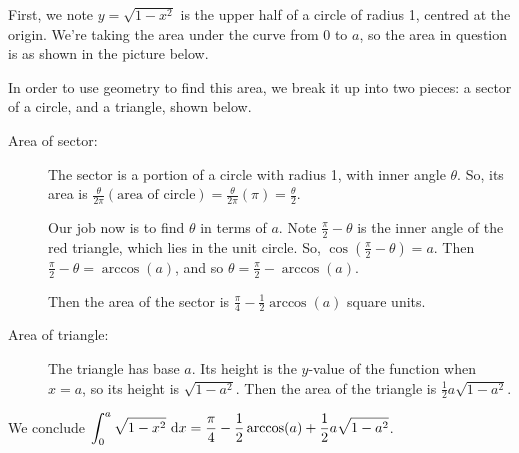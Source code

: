 \begin{solution}
First, we note $y=\sqrt{1-x^2}$ is the upper half of a circle of radius 1, centred at the origin. We're taking the area under the curve from 0 to $a$, so the area in question is as shown in the picture below.

\begin{center}
\end{center}

In order to use geometry to find this area, we break it up into two pieces: a sector of a circle, and a triangle, shown below.

\begin{center}
\end{center}
\begin{description}
\item[Area of sector:] The sector is a portion of a circle with radius 1, with inner angle $\theta$. So, its area is $\frac{\theta}{2\pi}\left(\mbox{area of circle}\right) = \frac{\theta}{2\pi}\left(\pi\right) = \frac{\theta}{2}$.

Our job now is to find $\theta$ in terms of $a$. Note $\frac{\pi}{2}-\theta$ is the inner angle of the red triangle, which lies in the unit circle. So, $\cos\left(\frac{\pi}{2}-\theta\right)=a$. Then $\frac{\pi}{2}-\theta= \arccos(a)$, and so $\theta = \frac{\pi}{2} - \arccos(a)$.

Then the area of the sector is $\frac{\pi}{4} - \frac{1}{2}\arccos(a)$ square units.
\item[Area of triangle:] The triangle has base $a$. Its height is the $y$-value of the function when $x=a$, so its height is $\sqrt{1-a^2}$. Then the area of the triangle is $\frac{1}{2}a\sqrt{1-a^2}$.
\end{description}
We conclude $\displaystyle\int_0^a \sqrt{1-x^2}\ \mathrm{d}x = \frac{\pi}{4} -\frac{1}{2} \arccos(a) + \frac{1}{2}a\sqrt{1-a^2}$.
\end{solution}



